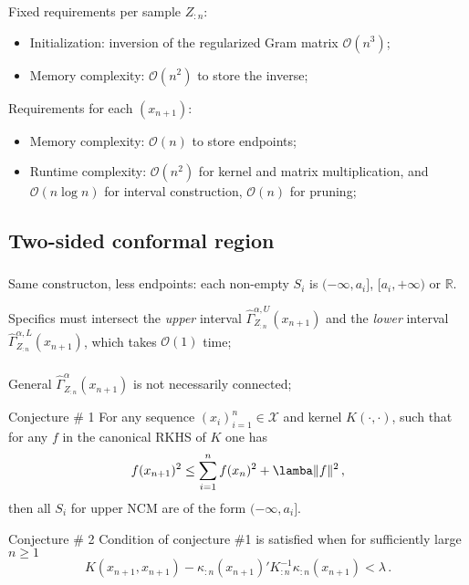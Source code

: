 \documentclass[t]{beamer}  %
\newcommand{\Xcal}{\mathcal{X}}
\newcommand{\Ocal}{\mathcal{O}}
\newcommand{\Real}{\mathbb{R}}
\begin{document}
\begin{frame}[c]\frametitle{\insertsection}
\framesubtitle{\insertsubsection}
  Fixed requirements per sample $Z_{:n}$: \begin{itemize}
    \item Initialization: inversion of the regularized Gram matrix $\Ocal(n^3)$;
    \item Memory complexity: $\Ocal(n^2)$ to store the inverse;
  \end{itemize}

  Requirements for each $(x_{n+1})$:
  \begin{itemize}
    \item Memory complexity: $\Ocal(n)$ to store endpoints;
    \item Runtime complexity: $\Ocal(n^2)$ for kernel and matrix multiplication,
    and $\Ocal(n \log n)$ for interval construction, $\Ocal(n)$ for pruning;
  \end{itemize}
\end{frame}


\subsection{Two-sided conformal region} %
\label{sub:two_sided_conformal_region}

\begin{frame}[c]\frametitle{\insertsection}
  \framesubtitle{\insertsubsection}
  Same constructon, less endpoints: each non-empty $S_i$ is $(-\infty, a_i]$,
  $[a_i, +\infty)$ or $\Real$.

  \begin{block}{Specifics}
    must intersect the \textit{upper} interval $\hat{\Gamma}_{Z_{:n}}^{\alpha, U}(x_{n+1})$
    and the \textit{lower} interval $\hat{\Gamma}_{Z_{:n}}^{\alpha, L}(x_{n+1})$, which
    takes $\Ocal(1)$ time;
  \end{block}
\end{frame}

\begin{frame}[c]\frametitle{\insertsection}
  \framesubtitle{\insertsubsection}
  General $\hat{\Gamma}_{Z_{:n}}^\alpha(x_{n+1})$ is not necessarily connected;
  \begin{block}{Conjecture \# 1}
    For any sequence $(x_i)_{i=1}^n\in \Xcal$ and kernel $K(\cdot, \cdot)$, such
    that for any $f$ in the canonical RKHS of $K$ one has
    $$ f(x_{n+1})^2 \leq \sum_{i=1}^n f(x_n)^2 + \lamba \|f\|^2 \,, $$
    then all $S_i$ for upper NCM are of the form $(-\infty, a_i]$.
  \end{block}
  \begin{block}{Conjecture \# 2}
    Condition of conjecture \#1 is satisfied when for sufficiently large $n\geq 1$
    $$ K(x_{n+1}, x_{n+1}) - \kappa_{:n}(x_{n+1})' K^{-1}_{:n} \kappa_{:n}(x_{n+1})
      < \lambda \,. $$
  \end{block}
\end{frame}
\end{document}
